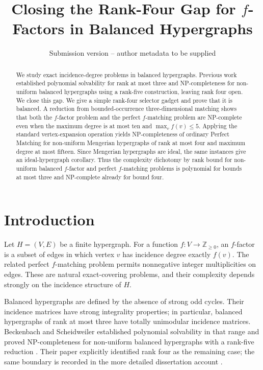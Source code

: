 \documentclass[11pt]{article}
\title{Closing the Rank-Four Gap for $f$-Factors in Balanced Hypergraphs}
\author{Submission version -- author metadata to be supplied}
\date{}
\theoremstyle{definition}
\theoremstyle{remark}
\newcommand{\Z}{\mathbb Z}
\begin{document}
\maketitle

\begin{abstract}
We study exact incidence-degree problems in balanced hypergraphs. Previous
work established polynomial solvability for rank at most three and
NP-completeness for non-uniform balanced hypergraphs using a rank-five
construction, leaving rank four open. We close this gap. We give a simple
rank-four selector gadget and prove that it is balanced. A reduction from
bounded-occurrence three-dimensional matching shows that both the
$f$-factor problem and the perfect $f$-matching problem are NP-complete even
when the maximum degree is at most ten and $\max_v f(v)\le5$. Applying the
standard vertex-expansion operation yields NP-completeness of ordinary
Perfect Matching for non-uniform Mengerian hypergraphs of rank at most four
and maximum degree at most fifteen. Since Mengerian hypergraphs are ideal,
the same instances give an ideal-hypergraph corollary. Thus the complexity
dichotomy by rank bound for non-uniform balanced $f$-factor and perfect
$f$-matching problems is polynomial for bounds at most three and
NP-complete already for bound four.
\end{abstract}

\section{Introduction}

Let $H=(V,E)$ be a finite hypergraph. For a function
$f:V\to\Z_{\ge0}$, an $f$-factor is a subset of edges in which vertex $v$
has incidence degree exactly $f(v)$. The related perfect $f$-matching
problem permits nonnegative integer multiplicities on edges. These are
natural exact-covering problems, and their complexity depends strongly on
the incidence structure of $H$.

Balanced hypergraphs are defined by the absence of strong odd cycles. Their
incidence matrices have strong integrality properties; in particular,
balanced hypergraphs of rank at most three have totally unimodular incidence
matrices. Beckenbach and Scheidweiler established polynomial solvability in
that range and proved NP-completeness for non-uniform balanced hypergraphs
with a rank-five reduction \cite{BS17}. Their paper explicitly identified
rank four as the remaining case; the same boundary is recorded in the more
detailed dissertation account \cite{Beckenbach2019}.
\end{document}
